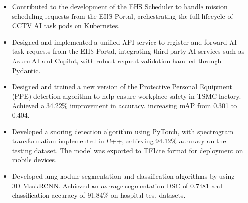 \begin{cventries}
{\begin{cvitems}
\begin{itemize}
            \item Contributed to the development of the EHS Scheduler to handle mission scheduling requests from the EHS Portal, 
            orchestrating the full lifecycle of CCTV AI task pods on Kubernetes.
        \end{itemize}
        \begin{itemize}
            \item Designed and implemented a unified API service to register and 
            forward AI task requests from the EHS Portal, integrating third-party 
            AI services such as Azure AI and Copilot, with robust request validation 
            handled through Pydantic.
        \end{itemize}
        \begin{itemize}
            \item Designed and trained a new version of the Protective Personal Equipment (PPE) detection algorithm to help ensure workplace safety in TSMC factory. 
            Achieved a 34.22\% improvement in accuracy, increasing mAP from 0.301 to 0.404.
        \end{itemize}
        \begin{itemize}
            \item Developed a snoring detection algorithm using PyTorch, with spectrogram transformation implemented in C++, achieving 
            94.12\% accuracy on the testing dataset. The model was exported to TFLite format for deployment on mobile devices.
        \end{itemize}
        \begin{itemize}
            \item Developed lung nodule segmentation and classification algorithms by using 3D MaskRCNN. Achieved an average segmentation DSC of 0.7481 and classification accuracy of 91.84\% on hospital test datasets. 
        \end{itemize}
    \end{cvitems}
}

\end{cventries}
